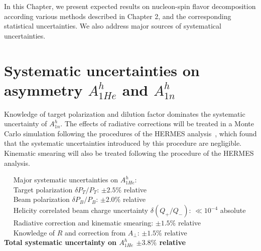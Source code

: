 
In this Chapter, we present expected results on nucleon-spin flavor decomposition according various methods described in Chapter 2, and 
the corresponding statistical uncertainties.  We also address major sources of systematical uncertainties.

\section{Systematic uncertainties on asymmetry $A_{1He}^h$ and $A_{1n}^h$}

Knowledge of target polarization and dilution factor dominates the systematic uncertainty of $A_{1n}^h$.
The effects of radiative corrections will be treated in a Monte Carlo simulation
following the procedures of the HERMES analysis~\cite{Airapetian:2004zf}, which found that the 
systematic uncertainties introduced by this procedure are negligible.  
Kinematic smearing will also be treated following the procedure of the HERMES analysis. 

\vspace{5.0mm}
\noindent ~\hspace{0.25cm} ~Major systematic uncertainties on $A_{1He}^h$:  \\
\noindent ~\hspace{0.25cm} ~Target polarization $\delta P_T/P_T$:  \hfill           $\pm 2.5\%$  relative \\ 
\noindent ~\hspace{0.25cm} ~Beam polarization $\delta P_B/P_B$:    \hfill           $\pm 2.0 \%$ relative \\
\noindent ~\hspace{0.25cm} ~Helicity correlated beam charge uncertainty $\delta (Q_+/Q_-)$:   \hfill  $\ll 10^{-4}$ absolute \\
\noindent ~\hspace{0.25cm} ~Radiative correction and kinematic smearing:                \hfill           $\pm 1.5 \%$  relative \\
\noindent ~\hspace{0.25cm} ~Knowledge of $R$ and correction from $A_{\perp}$:                \hfill           $\pm 1.5 \%$  relative \\
\vspace{-3.0mm}
{\bf 
\noindent \hspace{0.5cm} Total systematic uncertainty on $A_{1He}^h$  \hfill          $\pm 3.8 \%$  relative } \\

